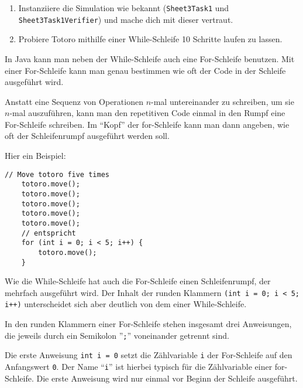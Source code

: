 
\begin{enumerate}
	\item Instanziiere die Simulation wie bekannt (\lstinline{Sheet3Task1} und \lstinline{Sheet3Task1Verifier}) und mache dich mit dieser vertraut.
	\item Probiere Totoro mithilfe einer While-Schleife 10 Schritte laufen zu lassen.\\

\end{enumerate}


\begin{Infobox}
	In Java kann man neben der While-Schleife auch eine For-Schleife benutzen.
	Mit einer For-Schleife kann man genau bestimmen wie oft der Code in der Schleife ausgeführt wird.\newline

	Anstatt eine Sequenz von Operationen $n$-mal untereinander zu schreiben, um sie $n$-mal auszuführen, kann man den repetitiven Code einmal in den Rumpf eine For-Schleife schreiben.
	Im \enquote{Kopf} der for-Schleife kann man dann angeben, wie oft der Schleifenrumpf ausgeführt werden soll.\newline

	Hier ein Beispiel:

	\begin{lstlisting}[numbers=none]
	// Move totoro five times
	totoro.move();
	totoro.move();
	totoro.move();
	totoro.move();
	totoro.move();
	// entspricht
	for (int i = 0; i < 5; i++) {
		totoro.move();
	}
	\end{lstlisting}

	Wie die While-Schleife hat auch die For-Schleife einen Schleifenrumpf, der mehrfach ausgeführt wird.
Der Inhalt der runden Klammern \lstinline{(int i = 0; i < 5; i++)} unterscheidet sich aber deutlich von dem einer While-Schleife.\newline

In den runden Klammern einer For-Schleife stehen insgesamt drei Anweisungen, die jeweils durch ein Semikolon ''\lstinline{;}'' voneinander getrennt sind.

Die erste Anweisung \lstinline{int i = 0} setzt die Zählvariable \lstinline{i} der For-Schleife auf den Anfangswert \lstinline{0}.
Der Name \enquote{\lstinline{i}} ist hierbei typisch für die Zählvariable einer for-Schleife.
Die erste Anweisung wird nur einmal vor Beginn der Schleife ausgeführt.\newline


\end{Infobox}
